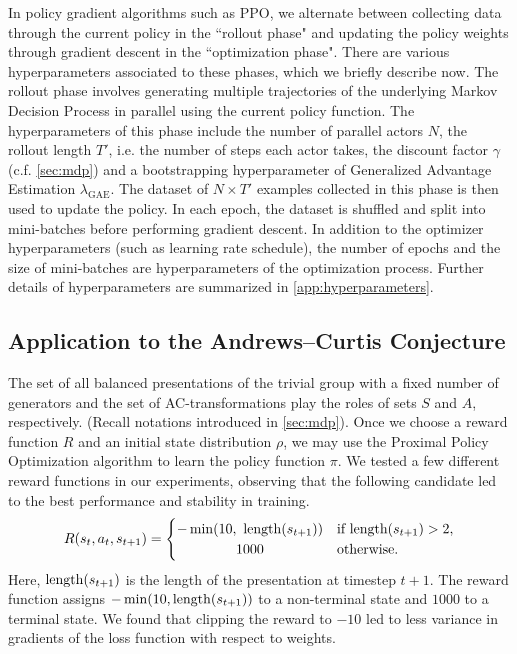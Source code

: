 In policy gradient algorithms such as PPO, we alternate between collecting data through the current policy in the ``rollout phase" and updating the policy weights through gradient descent in the ``optimization phase". There are various hyperparameters associated to these phases, which we briefly describe now. The rollout phase involves generating multiple trajectories of the underlying Markov Decision Process in parallel using the current policy function.
The hyperparameters of this phase include the number of parallel actors $N$, the rollout length $T'$, i.e. the number of steps each actor takes, the discount factor $\gamma$ (c.f. \autoref{sec:mdp}) and a bootstrapping hyperparameter of Generalized Advantage Estimation $\lambda_{\text{GAE}}$. The dataset of $N \times T'$ examples collected in this phase is then used to update the policy. In each epoch, the dataset is shuffled and split into mini-batches before performing gradient descent.
In addition to the optimizer hyperparameters (such as learning rate schedule), the number of epochs and the size of mini-batches are hyperparameters of the optimization process.
Further details of hyperparameters are summarized in \autoref{app:hyperparameters}.

\subsection{Application to the Andrews--Curtis Conjecture}\label{sec:application}

The set of all balanced presentations of the trivial group with a fixed number of generators and the set of AC-transformations play the roles of sets $S$ and $A$, respectively. (Recall notations introduced in \autoref{sec:mdp}). Once we choose a reward function $R$ and an initial state distribution $\rho$, we may use the Proximal Policy Optimization algorithm to learn the policy function $\pi$. We tested a few different reward functions in our experiments, observing that the following candidate led to the best performance and stability in training.
\[
R(s_{t}, a_{t}, s_{t+1}) =
\begin{cases}
	-\min(10, \ \length(s_{t+1})) & \text{if length}(s_{t+1}) > 2, \\
	\hfil 1000 & \text{otherwise.}
\end{cases}
\]
Here, $\operatorname{length}(s_{t+1})$ is the length of the presentation at timestep $t+1$. The reward function assigns $-\min(10, \operatorname{length}(s_{t+1}))$ to a non-terminal state and $1000$ to a terminal state. We found that clipping the reward to $-10$ led to less variance in gradients of the loss function with respect to weights.

